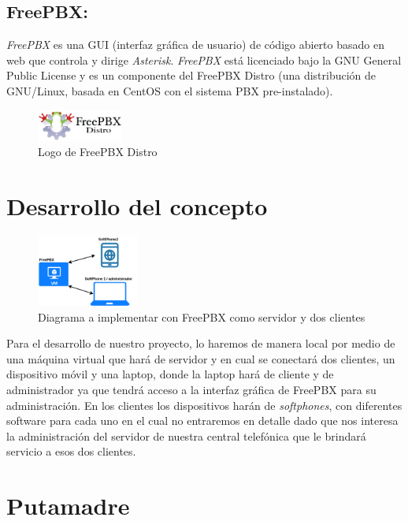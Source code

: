 \documentclass[conference]{IEEEtran}
\begin{document}
\subsection{\textbf{ FreePBX:}}
\textit{FreePBX} es una GUI (interfaz gráfica de usuario) de código abierto basado en web que controla y dirige \textit{Asterisk}. \textit{FreePBX} está licenciado bajo la GNU General Public License y es un componente del FreePBX Distro (una distribución de GNU/Linux, basada en CentOS con el sistema PBX pre-instalado).
\begin{figure}[h]
	\centerline{\includegraphics[width=0.25\textwidth]{img/freepbx01.png}}
	\caption{Logo de FreePBX Distro}
	\label{fig:ant04}
\end{figure}


\section{Desarrollo del concepto}\label{sec:ddc}
\begin{figure}[h]
	\centerline{\includegraphics[width=0.3\textwidth]{img/diagrama01.png}}
	\caption{Diagrama a implementar con FreePBX como servidor y dos clientes}
	\label{fig:ddc01}
\end{figure}

Para el desarrollo de nuestro proyecto, lo haremos de manera local por medio de una máquina virtual que hará de servidor y en cual se conectará dos clientes, un dispositivo móvil y una laptop, donde la laptop hará de cliente y de administrador ya que tendrá acceso a la interfaz gráfica de FreePBX para su administración. En los clientes los dispositivos harán de \textit{softphones}, con diferentes software para cada uno en el cual no entraremos en detalle dado que nos interesa la administración del servidor de nuestra central telefónica que le brindará servicio a esos dos clientes.

\section{Putamadre}
\end{document}

